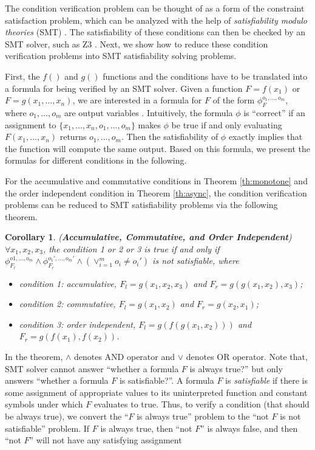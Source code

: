 The condition verification problem can be thought of as a form of the constraint satisfaction problem, which can be analyzed with the help of \emph{satisfiability modulo theories} (SMT) \cite{53e486195688442995f82bfe28c55731}. The satisfiability of these conditions can then be checked by an SMT solver, such as Z3 \cite{DeMoura:2008:ZES:1792734.1792766}. Next, we show how to reduce these condition verification problems into SMT satisfiability solving problems.

First, the $f()$ and $g()$ functions and the conditions have to be translated into a formula for being verified by an SMT solver. Given a function $F=f(x_1)$ or $F=g(x_1,\ldots,x_n)$, we are interested in a formula for $F$ of the form $\phi_F^{o_1,\ldots,o_m}$, where $o_1,\ldots,o_m$ are output variables \cite{Liu:2014:ADP:2670979.2670980}. Intuitively, the formula $\phi$ is ``correct'' if an assignment to $\{x_1,\ldots,x_n,o_1,\ldots,o_m\}$ makes $\phi$ be true if and only evaluating $F(x_1,\ldots,x_n)$ returns $o_1,\ldots,o_m$. Then the satisfiability of $\phi$ exactly implies that the function will compute the same output. Based on this formula, we present the formulas for different conditions in the following.

For the accumulative and commutative conditions in Theorem \ref{th:monotone} and the order independent condition in Theorem \ref{th:async}, the condition verification problems can be reduced to SMT satisfiability problems via the following theorem.

\newtheorem{corollary}{Corollary}
\begin{corollary}
	\label{coro:auto:1}
	(\textbf{Accumulative, Commutative, and Order Independent}) $\forall x_1,x_2,x_3$, the condition 1 or 2 or 3 is true if and only if $\phi_{F_l}^{o1,\ldots,o_m}\wedge \phi_{F_r}^{o_1',\ldots,o_m'}\wedge (\vee_{i=1}^m{o_i\neq o_i'})$ is not satisfiable, where
	\begin{itemize}
		\item condition 1: accumulative, $F_l=g(x_1,x_2,x_3)$ and $F_r=g(g(x_1,x_2),x_3)$;
		\item condition 2: commutative, $F_l=g(x_1,x_2)$ and $F_r=g(x_2,x_1)$;
		\item condition 3: order independent, $F_l=g(f(g(x_1,x_2)))$ and $F_r=g(f(x_1),f(x_2))$.
	\end{itemize}
\end{corollary}

In the theorem, $\wedge$ denotes AND operator and $\vee$ denotes OR operator. Note that, SMT solver cannot answer ``whether a formula $F$ is always true?'' but only answers ``whether a formula $F$ is satisfiable?''. A formula $F$ is \emph{satisfiable} if there is some assignment of appropriate values to its uninterpreted function and constant symbols under which $F$ evaluates to true. Thus, to verify a condition (that should be always true), we convert the ``$F$ is always true'' problem to the ``not $F$ is not satisfiable'' problem. If $F$ is always true, then ``not $F$'' is always false, and then ``not $F$'' will not have any satisfying assignment

